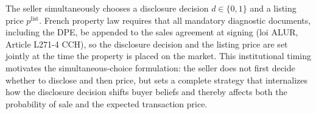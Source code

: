 The seller simultaneously chooses a disclosure decision $d\in\{0,1\}$ and a listing price $p^{\text{list}}$. French property law requires that all mandatory diagnostic documents, including the DPE, be appended to the sales agreement at signing (loi ALUR, Article L271-4 CCH), so the disclosure decision and the listing price are set jointly at the time the property is placed on the market. This institutional timing motivates the simultaneous-choice formulation: the seller does not first decide whether to disclose and then price, but sets a complete strategy that internalizes how the disclosure decision shifts buyer beliefs and thereby affects both the probability of sale and the expected transaction price.
